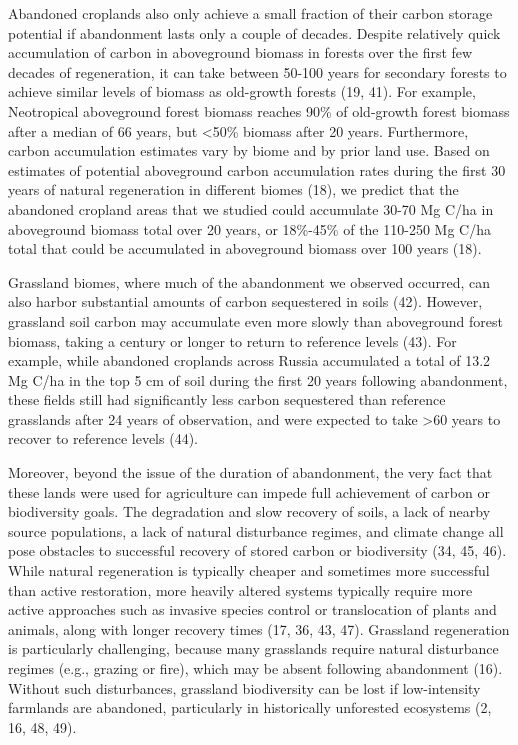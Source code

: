 \documentclass[9pt,twocolumn,twoside,lineno]{pnas-new}
\begin{document}
Abandoned croplands also only achieve a small fraction of their carbon storage potential if abandonment lasts only a couple of decades.
Despite relatively quick accumulation of carbon in aboveground biomass in forests over the first few decades of regeneration, it can take between 50-100 years for secondary forests to achieve similar levels of biomass as old-growth forests (19, 41).
For example, Neotropical aboveground forest biomass reaches 90\% of old-growth forest biomass after a median of 66 years, but \textless50\% biomass after 20 years.
Furthermore, carbon accumulation estimates vary by biome and by prior land use.
Based on estimates of potential aboveground carbon accumulation rates during the first 30 years of natural regeneration in different biomes (18), we predict that the abandoned cropland areas that we studied could accumulate 30-70 Mg C/ha in aboveground biomass total over 20 years, or 18\%-45\% of the 110-250 Mg C/ha total that could be accumulated in aboveground biomass over 100 years (18).

Grassland biomes, where much of the abandonment we observed occurred, can also harbor substantial amounts of carbon sequestered in soils (42).
However, grassland soil carbon may accumulate even more slowly than aboveground forest biomass, taking a century or longer to return to reference levels (43).
For example, while abandoned croplands across Russia accumulated a total of 13.2 Mg C/ha in the top 5 cm of soil during the first 20 years following abandonment, these fields still had significantly less carbon sequestered than reference grasslands after 24 years of observation, and were expected to take \textgreater60 years to recover to reference levels (44).

Moreover, beyond the issue of the duration of abandonment, the very fact that these lands were used for agriculture can impede full achievement of carbon or biodiversity goals.
The degradation and slow recovery of soils, a lack of nearby source populations, a lack of natural disturbance regimes, and climate change all pose obstacles to successful recovery of stored carbon or biodiversity (34, 45, 46).
While natural regeneration is typically cheaper and sometimes more successful than active restoration, more heavily altered systems typically require more active approaches such as invasive species control or translocation of plants and animals, along with longer recovery times (17, 36, 43, 47).
Grassland regeneration is particularly challenging, because many grasslands require natural disturbance regimes (e.g., grazing or fire), which may be absent following abandonment (16).
Without such disturbances, grassland biodiversity can be lost if low-intensity farmlands are abandoned, particularly in historically unforested ecosystems (2, 16, 48, 49).
\end{document}
